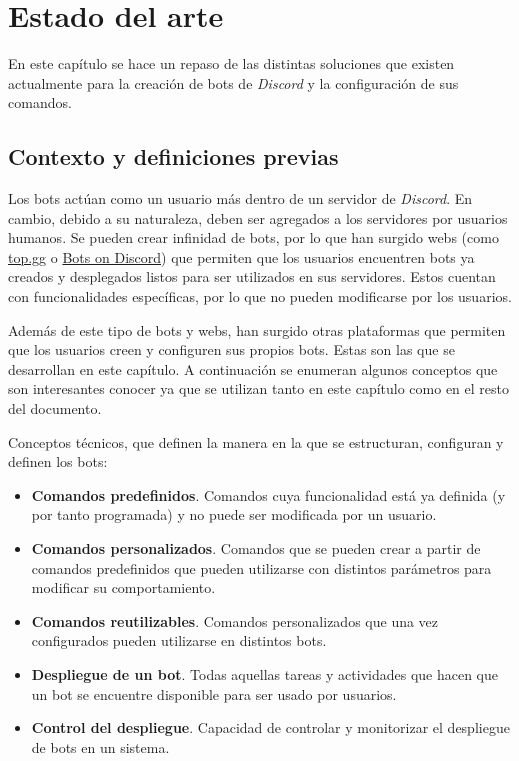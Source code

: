 \chapter{Estado del arte}

En este capítulo se hace un repaso de las distintas soluciones que existen actualmente para la creación de bots de \textit{Discord} y la configuración de sus comandos.

\section{Contexto y definiciones previas}

Los bots actúan como un usuario más dentro de un servidor de \textit{Discord}. En cambio, debido a su naturaleza, deben ser agregados a los servidores por usuarios humanos. Se pueden crear infinidad de bots, por lo que han surgido webs (como \href{https://top.gg/}{top.gg} o \href{https://bots.ondiscord.xyz/}{Bots on Discord}) que permiten que los usuarios encuentren bots ya creados y desplegados listos para ser utilizados en sus servidores. Estos cuentan con funcionalidades específicas, por lo que no pueden modificarse por los usuarios.

Además de este tipo de bots y webs, han surgido otras plataformas que permiten que los usuarios creen y configuren sus propios bots. Estas son las que se desarrollan en este capítulo. A continuación se enumeran algunos conceptos que son interesantes conocer ya que se utilizan tanto en este capítulo como en el resto del documento.

Conceptos técnicos, que definen la manera en la que se estructuran, configuran y definen los bots:

\begin{itemize}
	\item \textbf{Comandos predefinidos}. Comandos cuya funcionalidad está ya definida (y por tanto programada) y no puede ser modificada por un usuario.
	\item \textbf{Comandos personalizados}. Comandos que se pueden crear a partir de comandos predefinidos que pueden utilizarse con distintos parámetros para modificar su comportamiento.
	\item \textbf{Comandos reutilizables}. Comandos personalizados que una vez configurados pueden utilizarse en distintos bots.
	\item \textbf{Despliegue de un bot}. Todas aquellas tareas y actividades que hacen que un bot se encuentre disponible para ser usado por usuarios.
	\item \textbf{Control del despliegue}. Capacidad de controlar y monitorizar el despliegue de bots en un sistema.
\end{itemize}

